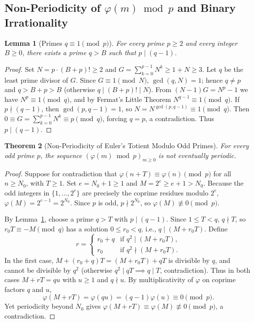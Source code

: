 \documentclass[11pt,a4paper]{article}
\newtheorem{theorem}{Theorem}[section]
\newtheorem{lemma}[theorem]{Lemma}
\theoremstyle{definition}
\begin{document}
\subsection{Non-Periodicity of \texorpdfstring{$\varphi(m) \bmod p$}{phi(m) mod p} and Binary Irrationality}

\begin{lemma}[Primes $q \equiv 1 \pmod p$]
\label{lem:prime-1-mod-p}
For every prime $p \ge 2$ and every integer $B \ge 0$, there exists a prime $q > B$ such that $p \mid (q - 1)$.
\end{lemma}

\begin{proof}
Set $N = p \cdot (B + p)! \ge 2$ and $G = \sum_{k=0}^{p-1} N^k \ge 1 + N \ge 3$. Let $q$ be the least prime divisor of $G$. Since $G \equiv 1 \pmod N$, $\gcd(q, N) = 1$; hence $q \neq p$ and $q > B + p > B$ (otherwise $q \mid (B + p)! \mid N$). From $(N - 1)G = N^p - 1$ we have $N^p \equiv 1 \pmod q$, and by Fermat's Little Theorem $N^{q-1} \equiv 1 \pmod q$. If $p \nmid (q - 1)$, then $\gcd(p, q - 1) = 1$, so $N = N^{\gcd(p, q-1)} \equiv 1 \pmod q$. Then $0 \equiv G = \sum_{k=0}^{p-1} N^k \equiv p \pmod q$, forcing $q = p$, a contradiction. Thus $p \mid (q - 1)$.
\end{proof}

\begin{theorem}[Non-Periodicity of Euler's Totient Modulo Odd Primes]
\label{thm:totient-nonper}
For every odd prime $p$, the sequence $(\varphi(m) \bmod p)_{m \ge 0}$ is \emph{not} eventually periodic.
\end{theorem}

\begin{proof}
Suppose for contradiction that $\varphi(n + T) \equiv \varphi(n) \pmod p$ for all $n \ge N_0$, with $T \ge 1$. Set $e = N_0 + 1 \ge 1$ and $M = 2^e \ge e + 1 > N_0$. Because the odd integers in $\{1, \dots, 2^e\}$ are precisely the coprime residues modulo $2^e$, $\varphi(M) = 2^{e-1} = 2^{N_0}$. Since $p$ is odd, $p \nmid 2^{N_0}$, so $\varphi(M) \not\equiv 0 \pmod p$.

By Lemma~\ref{lem:prime-1-mod-p}, choose a prime $q > T$ with $p \mid (q - 1)$. Since $1 \le T < q$, $q \nmid T$, so $r_0 T \equiv -M \pmod q$ has a solution $0 \le r_0 < q$, i.e., $q \mid (M + r_0 T)$. Define
\[
  r = \begin{cases}
    r_0 + q & \text{if } q^2 \mid (M + r_0 T),\\
    r_0 & \text{if } q^2 \nmid (M + r_0 T).
  \end{cases}
\]
In the first case, $M + (r_0 + q)T = (M + r_0 T) + qT$ is divisible by $q$, and cannot be divisible by $q^2$ (otherwise $q^2 \mid qT \implies q \mid T$, contradiction). Thus in both cases $M + rT = q u$ with $u \ge 1$ and $q \nmid u$. By multiplicativity of $\varphi$ on coprime factors $q$ and $u$,
\[
  \varphi(M + rT) = \varphi(qu) = (q - 1)\varphi(u) \equiv 0 \pmod p.
\]
Yet periodicity beyond $N_0$ gives $\varphi(M + rT) \equiv \varphi(M) \not\equiv 0 \pmod p$, a contradiction.
\end{proof}
\end{document}

